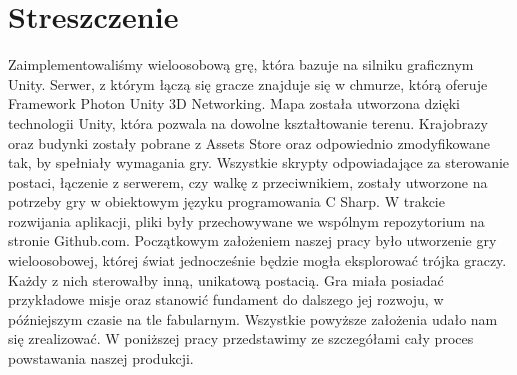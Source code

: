\section{Streszczenie}
Zaimplementowaliśmy wieloosobową grę, która bazuje na silniku graficznym Unity. 
Serwer, z którym łączą się gracze znajduje się w chmurze, którą oferuje Framework Photon Unity 3D Networking. 
Mapa została utworzona dzięki technologii Unity, która pozwala na dowolne kształtowanie terenu.
Krajobrazy oraz budynki zostały pobrane z Assets Store oraz odpowiednio zmodyfikowane tak, by spełniały wymagania gry. 
Wszystkie skrypty odpowiadające za sterowanie postaci, łączenie z serwerem, czy walkę z przeciwnikiem, zostały utworzone na potrzeby gry w obiektowym języku programowania C Sharp.
W trakcie rozwijania aplikacji, pliki były przechowywane we wspólnym repozytorium na stronie Github.com. 
Początkowym założeniem naszej pracy było utworzenie gry wieloosobowej, której świat jednocześnie będzie mogła eksplorować trójka graczy. Każdy z nich sterowałby inną, unikatową postacią. 
Gra miała posiadać przykładowe misje oraz stanowić fundament do dalszego jej rozwoju, w późniejszym czasie na tle fabularnym. Wszystkie powyższe założenia udało nam się zrealizować. 
W poniższej pracy przedstawimy ze szczegółami cały proces powstawania naszej produkcji. 